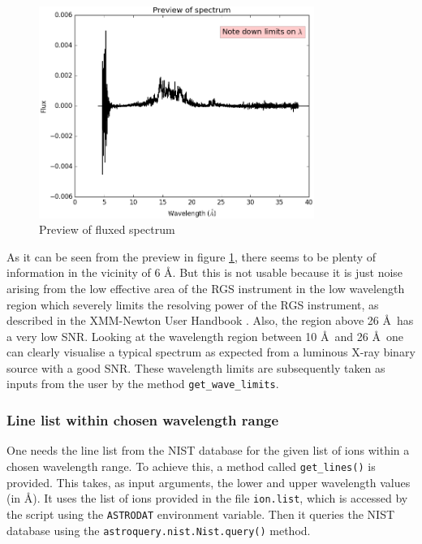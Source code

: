                 \begin{figure}[h!]
    				\centering
    				\caption{Preview of fluxed spectrum}
    				\label{fig:spec-preview}
    				\includegraphics[width=0.8\textwidth]{images/mrvel_preview}
			    \end{figure}
			    
			    As it can be seen from the preview in figure \ref{fig:spec-preview}, there seems to be plenty of information in the vicinity of 6 \AA. But this is not usable because it is just noise arising from the low effective area of the RGS instrument in the low wavelength region which severely limits the resolving power of the RGS instrument, as described in the XMM-Newton User Handbook \cite{xmmUserHandbook}. Also, the region above 26 \AA~has a very low SNR. Looking at the wavelength region between 10 \AA~and 26 \AA~one can clearly visualise a typical spectrum as expected from a luminous X-ray binary source with a good SNR. These wavelength limits are subsequently taken as inputs from the user by the method \texttt{get\_wave\_limits}.
			 
            \subsubsection{Line list within chosen wavelength range} \label{tool:rgs-files:demonstration:linelist}
                One needs the line list from the NIST database for the given list of ions within a chosen wavelength range. To achieve this, a method called \texttt{get\_lines()} is provided. This takes, as input arguments, the lower and upper wavelength values (in \AA). It uses the list of ions provided in the file \texttt{ion.list}, which is accessed by the script using the \texttt{ASTRODAT} environment variable. Then it queries the NIST database using the \texttt{astroquery.nist.Nist.query()} method.
                
